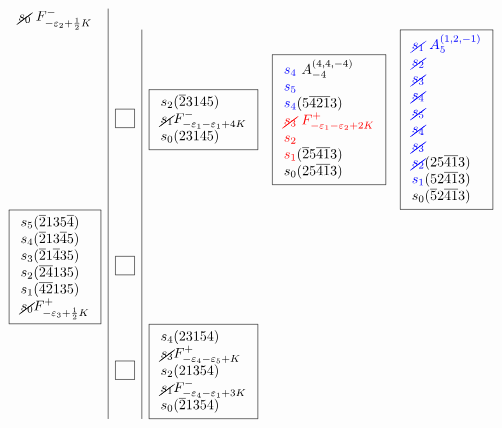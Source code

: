 \documentclass[11pt]{article}
\theoremstyle{plain}
\theoremstyle{definition}
\newenvironment{example}
  {\pushQED{\qed}\exampleinner}
  {\popQED\endexampleinner}
\theoremstyle{remark}
\numberwithin{equation}{section}
\newcounter{r}
\newcounter{s}
\begin{document}
\begin{example}
$$\begin{array}{c|c|ccccc}
{\begin{array}{l}
\cancel{s_0}\ F^-_{-\varepsilon_2+\frac12K}
\end{array}
}
\\
&\boxed{\phantom{T} } &\boxed{
\begin{array}{l}
s_2(\overline{2}3145) \\
\cancel{s_1}F^-_{-\varepsilon_1-\varepsilon_1+4K} \\
s_0(23145)
\end{array}
}
&\boxed{
\begin{array}{l}
{\color{blue}{s_4}}\ A_{-4}^{(4,4,-4)}
\\
{\color{blue}{s_5}} 
\\
{\color{blue}{s_4}}(5\overline{4}\overline{2}\overline{1}3) \\
{\color{red}{\cancel{s_3}}\ F^+_{-\varepsilon_1-\varepsilon_2+2K}} \\
{\color{red}{s_2}} 
\\
{\color{red}{s_1}}(\overline{2}5\overline{4}\overline{1}3) \\
s_0(25\overline{4}\overline{1}3) 
\end{array}
}
&\boxed{
\begin{array}{l}
{\color{blue}{\cancel{s_1}}\ A_5^{(1,2,-1)} }  \\
{\color{blue}{\cancel{s_2}}} \\
{\color{blue}{\cancel{s_3}}} \\
{\color{blue}{\cancel{s_4}}}  \\
{\color{blue}{\cancel{s_5}}} \\
{\color{blue}{\cancel{s_4}}}  \\
{\color{blue}{\cancel{s_3}}}  \\
{\color{blue}{\cancel{s_2}}} (25\overline{4}\overline{1}3) \\
{\color{blue}{s_1}} (52\overline{4}\overline{1}3) \\
s_0(\overline{5}2\overline{4}\overline{1}3) 
\end{array}
} 
\\
\boxed{\begin{array}{l}
s_5(\overline{2}135\overline{4}) \\
s_4(\overline{2}13\overline{4}5) \\
s_3(\overline{2}1\overline{4}35) \\
s_2(\overline{2}\overline{4}135) \\
s_1(\overline{4}\overline{2}135) \\
\cancel{s_0}F^+_{-\varepsilon_3+\frac12 K}
\end{array}
}
&\boxed{\phantom{T} }  \\
&\boxed{\phantom{T} } &\boxed{
\begin{array}{l}
s_4(23154) \\
\cancel{s_3}F^+_{-\varepsilon_4-\varepsilon_5+K} \\
s_2(21354) \\
\cancel{s_1}F^-_{-\varepsilon_4-\varepsilon_1+3K} \\
s_0(\overline{2}1354)
\end{array}
}
\\
\end{array}
$$



\end{example}
\end{document}

